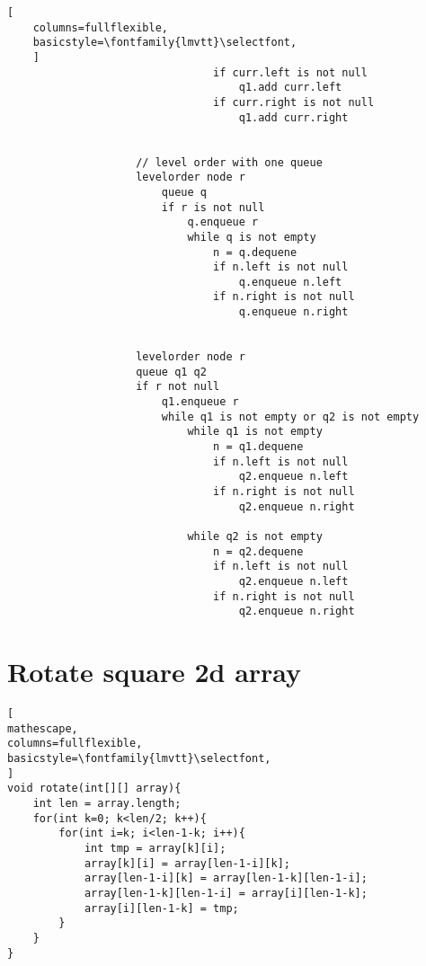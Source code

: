 \documentclass{article}
\begin{document}
\begin{lstlisting}[
    columns=fullflexible,
    basicstyle=\fontfamily{lmvtt}\selectfont,
    ]
                                if curr.left is not null
                                    q1.add curr.left
                                if curr.right is not null
                                    q1.add curr.right
                        

                    // level order with one queue
                    levelorder node r
                        queue q
                        if r is not null
                            q.enqueue r
                            while q is not empty
                                n = q.dequene
                                if n.left is not null
                                    q.enqueue n.left
                                if n.right is not null
                                    q.enqueue n.right

        
                    levelorder node r
                    queue q1 q2
                    if r not null
                        q1.enqueue r
                        while q1 is not empty or q2 is not empty
                            while q1 is not empty
                                n = q1.dequene
                                if n.left is not null
                                    q2.enqueue n.left
                                if n.right is not null
                                    q2.enqueue n.right

                            while q2 is not empty
                                n = q2.dequene
                                if n.left is not null
                                    q2.enqueue n.left
                                if n.right is not null
                                    q2.enqueue n.right

\end{lstlisting} 


\section{Rotate square 2d array}
\begin{lstlisting}[
mathescape,
columns=fullflexible,
basicstyle=\fontfamily{lmvtt}\selectfont,
]
void rotate(int[][] array){
    int len = array.length;
    for(int k=0; k<len/2; k++){
        for(int i=k; i<len-1-k; i++){
            int tmp = array[k][i];
            array[k][i] = array[len-1-i][k];
            array[len-1-i][k] = array[len-1-k][len-1-i];
            array[len-1-k][len-1-i] = array[i][len-1-k];
            array[i][len-1-k] = tmp;
        }
    }
}
\end{lstlisting} 
\end{document}
